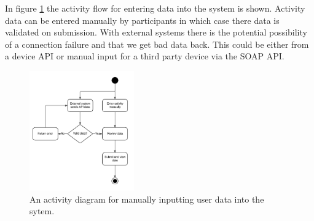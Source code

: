 In figure \ref{fig:activity-diagram-manual-api-data-input} the activity flow for entering data into the system is shown. Activity data can be entered manually by participants in which case there data is validated on submission. With external systems there is the potential possibility of a connection failure and that we get bad data back. This could be either from a device API or manual input for a third party device via the SOAP API. 

\begin{figure}[H]
\centering
\includegraphics[width=0.4\textwidth]{../design/UML/StateActivity/Manual-API-Data-Input.png}
\caption{An activity diagram for manually inputting user data into the sytem.}
\label{fig:activity-diagram-manual-api-data-input}
\end{figure}



